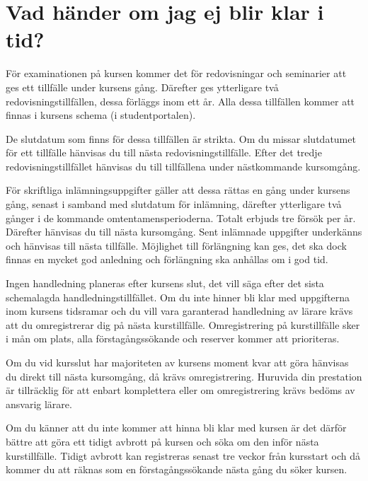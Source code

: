 \documentclass[a4paper,logo]{miunart}
\begin{document}
\section{Vad händer om jag ej blir klar i tid?}
\label{sec:late}
%
För examinationen på kursen kommer det för redovisningar och seminarier att ges 
ett tillfälle under kursens gång.
Därefter ges ytterligare två redovisningstillfällen, dessa förläggs inom ett 
år.
Alla dessa tillfällen kommer att finnas i kursens schema (i studentportalen).

De slutdatum som finns för dessa tillfällen är strikta.
Om du missar slutdatumet för ett tillfälle hänvisas du till nästa 
redovisningstillfälle.
Efter det tredje redovisningstillfället hänvisas du till tillfällena under 
nästkommande kursomgång.

För skriftliga inlämningsuppgifter gäller att dessa rättas en gång under 
kursens gång, senast i samband med slutdatum för inlämning, därefter 
ytterligare två gånger i de kommande omtentamensperioderna.
Totalt erbjuds tre försök per år.
Därefter hänvisas du till nästa kursomgång.
Sent inlämnade uppgifter underkänns och hänvisas till nästa tillfälle.
Möjlighet till förlängning kan ges, det ska dock finnas en mycket god anledning 
och förlängning ska anhållas om i god tid.

Ingen handledning planeras efter kursens slut, det vill säga efter det sista 
schemalagda handledningstillfället.
Om du inte hinner bli klar med uppgifterna inom kursens tidsramar och du vill 
vara garanterad handledning av lärare krävs att du omregistrerar dig på nästa 
kurstillfälle.
Omregistrering på kurstillfälle sker i mån om plats, alla förstagångssökande 
och reserver kommer att prioriteras.

Om du vid kursslut har majoriteten av kursens moment kvar att göra hänvisas du 
direkt till nästa kursomgång, då krävs omregistrering.
Huruvida din prestation är tillräcklig för att enbart komplettera eller om 
omregistrering krävs bedöms av ansvarig lärare.

Om du känner att du inte kommer att hinna bli klar med kursen är det därför 
bättre att göra ett tidigt avbrott på kursen och söka om den inför nästa 
kurstillfälle.
Tidigt avbrott kan registreras senast tre veckor från kursstart och då kommer 
du att räknas som en förstagångssökande nästa gång du söker kursen.


\printbibliography
\end{document}

